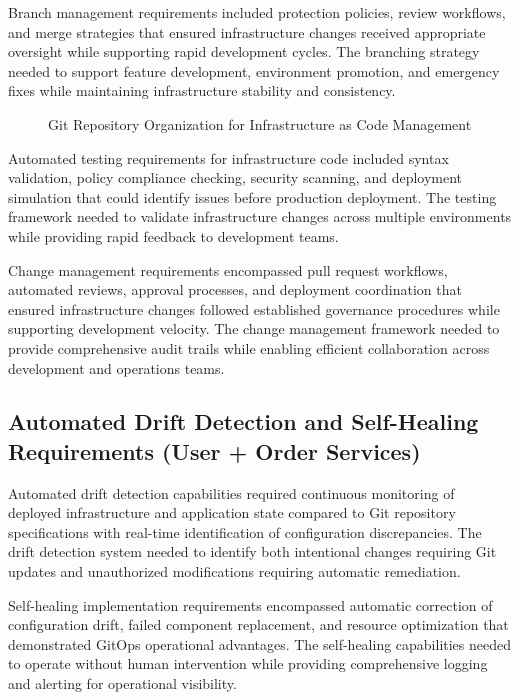 Branch management requirements included protection policies, review workflows, and merge strategies that ensured infrastructure changes received appropriate oversight while supporting rapid development cycles. The branching strategy needed to support feature development, environment promotion, and emergency fixes while maintaining infrastructure stability and consistency.

\begin{figure}[H]
\centering
\caption{Git Repository Organization for Infrastructure as Code Management}
\label{fig:git-infrastructure-structure}
\end{figure}

Automated testing requirements for infrastructure code included syntax validation, policy compliance checking, security scanning, and deployment simulation that could identify issues before production deployment. The testing framework needed to validate infrastructure changes across multiple environments while providing rapid feedback to development teams.

Change management requirements encompassed pull request workflows, automated reviews, approval processes, and deployment coordination that ensured infrastructure changes followed established governance procedures while supporting development velocity. The change management framework needed to provide comprehensive audit trails while enabling efficient collaboration across development and operations teams.

\subsection{Automated Drift Detection and Self-Healing Requirements (User + Order Services)}

Automated drift detection capabilities required continuous monitoring of deployed infrastructure and application state compared to Git repository specifications with real-time identification of configuration discrepancies. The drift detection system needed to identify both intentional changes requiring Git updates and unauthorized modifications requiring automatic remediation.

Self-healing implementation requirements encompassed automatic correction of configuration drift, failed component replacement, and resource optimization that demonstrated GitOps operational advantages. The self-healing capabilities needed to operate without human intervention while providing comprehensive logging and alerting for operational visibility.

